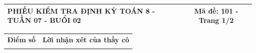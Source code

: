 \documentclass[12pt,a4paper]{article}
\begin{document}
\pagestyle{empty}
\noindent
\begin{tabularx}{\linewidth}{|X|c|}
\hline
\textbf{PHIẾU KIỂM TRA ĐỊNH KỲ TOÁN 8 - TUẦN 07 - BUỔI 02} & \textbf{Mã đề: 101 - Trang 1/2} \\
\hline
\end{tabularx}

\vspace{1.2mm}

\noindent
\begin{tabularx}{\linewidth}{|p{3.2cm}|X|}
\hline
\centering\textbf{Điểm số} & \centering\textbf{Lời nhận xét của thầy cô} \tabularnewline
\rule{0pt}{1.8cm} & \\
\hline
\end{tabularx}

\vspace{1.2mm}
\end{document}
